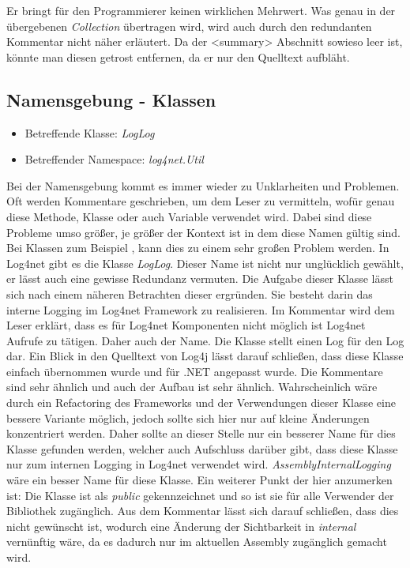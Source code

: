 Er bringt für den Programmierer keinen wirklichen Mehrwert. Was genau in der übergebenen \textit{Collection} übertragen wird, wird auch durch den redundanten Kommentar nicht näher erläutert. Da der <summary> Abschnitt sowieso leer ist, könnte man diesen getrost entfernen, da er nur den Quelltext aufbläht. 

\subsection{Namensgebung - Klassen}
\begin{itemize}
	\item Betreffende Klasse: \textit{LogLog}
	\item Betreffender Namespace: \textit{log4net.Util}
\end{itemize}

Bei der Namensgebung kommt es immer wieder zu Unklarheiten und Problemen. Oft werden Kommentare geschrieben, um dem Leser zu vermitteln, wofür genau diese Methode, Klasse oder auch Variable verwendet wird. Dabei sind diese Probleme umso größer, je größer der Kontext ist in dem diese Namen gültig sind. Bei Klassen zum Beispiel , kann dies zu einem sehr großen Problem werden. In Log4net gibt es die Klasse \textit{LogLog}. Dieser Name ist nicht nur unglücklich gewählt, er lässt auch eine gewisse Redundanz vermuten. Die Aufgabe dieser Klasse lässt sich nach einem näheren Betrachten dieser ergründen. Sie besteht darin das interne Logging im Log4net Framework zu realisieren. Im Kommentar wird dem Leser erklärt, dass es für Log4net Komponenten nicht möglich ist Log4net Aufrufe zu tätigen. Daher auch der Name. Die Klasse stellt einen Log für den Log dar. Ein Blick in den Quelltext von Log4j lässt darauf schließen, dass diese Klasse einfach übernommen wurde und für .NET angepasst wurde. Die Kommentare sind sehr ähnlich und auch der Aufbau ist sehr ähnlich. Wahrscheinlich wäre durch ein Refactoring des Frameworks und der Verwendungen dieser Klasse eine bessere Variante möglich, jedoch sollte sich hier nur auf kleine Änderungen konzentriert werden. Daher sollte an dieser Stelle nur ein besserer Name für dies Klasse gefunden werden, welcher auch Aufschluss darüber gibt, dass diese Klasse nur zum internen Logging in Log4net verwendet wird. \textit{AssemblyInternalLogging} wäre ein besser Name für diese Klasse. Ein weiterer Punkt der hier anzumerken ist: Die Klasse ist als \textit{public} gekennzeichnet und so ist sie für alle Verwender der Bibliothek zugänglich. Aus dem Kommentar lässt sich darauf schließen, dass dies nicht gewünscht ist, wodurch eine Änderung der Sichtbarkeit in \textit{internal} vernünftig wäre, da es dadurch nur im aktuellen Assembly zugänglich gemacht wird.

